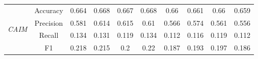 \begin{table}[H]
\begin{tabular}{|c|c|c|c|c|c|c|c|c|c|}
                                            \multirow{4}{*}{\textit{CAIM}}  & Accuracy & 0.664 & 0.668 & 0.667 & 0.668 & 0.66 & 0.661 & 0.66 & 0.659 \\ \cline{2-10}
                                             & Precision & 0.581 & 0.614 & 0.615 & 0.61 & 0.566 & 0.574 & 0.561 & 0.556 \\ \cline{2-10}
                                             & Recall & 0.134 & 0.131 & 0.119 & 0.134 & 0.112 & 0.116 & 0.119 & 0.112 \\ \cline{2-10}
                                             & F1 & 0.218 & 0.215 & 0.2 & 0.22 & 0.187 & 0.193 & 0.197 & 0.186 \\ \hline  \hline
            \hline
        \end{tabular}
    \end{table}
